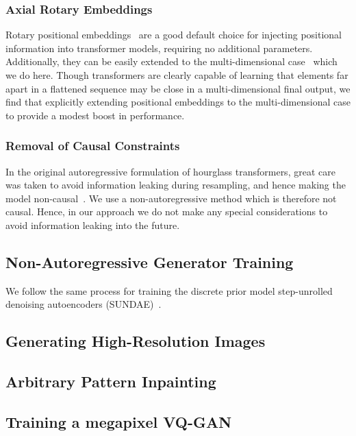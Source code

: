 \subsubsection{Axial Rotary Embeddings}

Rotary positional embeddings~\cite{su2021roformer} are a good default choice for
injecting positional information into transformer models, requiring no
additional parameters. Additionally, they can be easily extended to the
multi-dimensional case~\cite{rope-eleutherai} which we do here. Though
transformers are clearly capable of learning that elements far apart in a
flattened sequence may be close in a multi-dimensional final output, we find
that explicitly extending positional embeddings to the multi-dimensional case to
provide a modest boost in performance.

\subsubsection{Removal of Causal Constraints}

In the original autoregressive formulation of hourglass transformers, great care
was taken to avoid information leaking during resampling, and hence making the
model non-causal~\cite{nawrot2021hierarchical}. We use a non-autoregressive
method which is therefore not causal. Hence, in our approach we do not make any
special considerations to avoid information leaking into the future.

\subsection{Non-Autoregressive Generator Training}
We follow the same process for training the discrete prior model step-unrolled
denoising autoencoders (SUNDAE)~\cite{savinov2022stepunrolled}.


\subsection{Generating High-Resolution Images}


\subsection{Arbitrary Pattern Inpainting}

\subsection{Training a megapixel VQ-GAN}

\label{sec:megagan}
